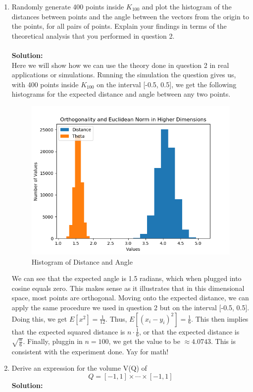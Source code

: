 \documentclass[11pt]{article}
\begin{document}
\begin{enumerate}
	\item Randomly generate 400 points inside $K_{100}$ and plot the histogram of the distances
	between points and the angle between the vectors from the origin to the points, for
	all pairs of points. Explain your findings in terms of the theoretical analysis that you
	performed in question 2. \\\\
	\textbf{Solution:} \\
	Here we will show how we can use the theory done in question 2 in real applications or simulations. Running the simulation the question gives us, with 400 points inside $K_{100}$ on the interval [-0.5, 0.5], we get the following histograms
	for the expected distance and angle between any two points.
	\begin{figure}[H]
		\centering
		\includegraphics[width = 0.6 \linewidth]{DistanceAngles.png}
		\caption{Histogram of Distance and Angle}
		\label{fig:Hists}
	\end{figure}
	We can see that the expected angle is 1.5 radians, which when plugged into cosine equals zero. This makes sense as it illustrates that in this dimensional space, most points are orthogonal. Moving onto the expected distance, we can apply the same procedure we used in question 2 but on the interval [-0.5, 0.5].
	Doing this, we get $E[x^2] = \frac{1}{12}$. Thus, $E[(x_i - y_i)^2] = \frac{1}{6}$. This then implies that the expected squared distance is $n\cdot\frac{1}{6}$, or that the expected distance is $\sqrt{\frac{n}{6}}$. 
	Finally, pluggin in $n=100$, we get the value to be $\approx 4.0743$. This is consistent with the experiment done. Yay for math!
	\item Derive an expression for the volume V(Q) of 
	\begin{equation}
		Q = [-1, 1] \times \cdots \times [-1, 1]
	\end{equation}
	\textbf{Solution:} \\

\end{enumerate}
\end{document}
